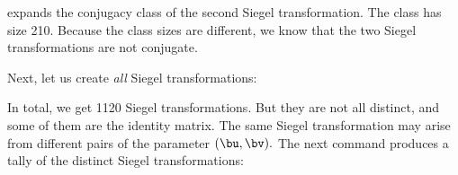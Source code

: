 
expands the conjugacy class of the second Siegel transformation. The class has size 210.
Because the class sizes are different, we know that the two Siegel transformations are not conjugate. 

Next, let us create {\em all} Siegel transformations:


In total, we get 1120 Siegel transformations. 
But they are not all distinct, and some of them are the identity matrix. 
The same Siegel transformation may arise from different pairs of the parameter $(\bu,\bv).$
The next command produces a tally of the distinct Siegel transformations:




